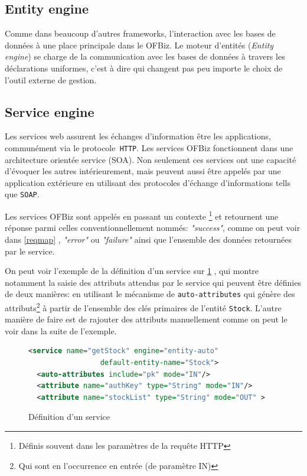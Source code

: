 \subsection{Entity engine}
Comme dans beaucoup d'autres frameworks, l'interaction avec les bases de données à une place principale dans le OFBiz. Le moteur d'entités (\emph{Entity engine}) se charge de la communication avec les  bases de données à travers les déclarations uniformes, c'est à dire qui changent pas peu importe le choix de l'outil externe de gestion.



\subsection{Service engine}
Les services web assurent les échanges d'information être les applications, communément via le protocole\verb| HTTP|.   
Les services OFBiz fonctionnent dans une architecture orientée service (SOA). Non seulement ces services ont une capacité d'évoquer les autres intérieurement, mais peuvent aussi être appelés par une application extérieure en utilisant des protocoles d'échange d'informations tells que \verb|SOAP|. 

Les services OFBiz sont appelés en passant un contexte \footnote{Définis souvent dans les paramètres de la requête HTTP } et retournent une réponse parmi celles conventionnellement nommés: \emph{"success"}, comme on peut voir dans  \ref{reqmap} , \emph{"error"} ou \emph{"failure"} ainsi que l'ensemble des données retournées par le service. 

On peut voir l'exemple de la définition d'un service sur \ref{servicedef} , qui montre notamment la saisie des attributs attendus par le service qui peuvent être définies de deux manières: en utilisant le mécanisme de \verb|auto-attributes| qui génère des attributs\footnote{Qui sont en l'occurrence en entrée (de paramètre IN)} à partir de l'ensemble des clés primaires de l'entité \verb|Stock|. L'autre manière de faire est de rajouter des attributs manuellement comme on peut le voir dans la suite de l'exemple. 

\begin{figure}
\begin{lstlisting}[frame=leftline,language=XML]
<service name="getStock" engine="entity-auto"
				 default-entity-name="Stock">
  <auto-attributes include="pk" mode="IN"/>
  <attribute name="authKey" type="String" mode="IN"/>
  <attribute name="stockList" type="String" mode="OUT" >

\end{lstlisting}
\caption{Définition d'un service}
\label{servicedef}
\end{figure}
\newpage

